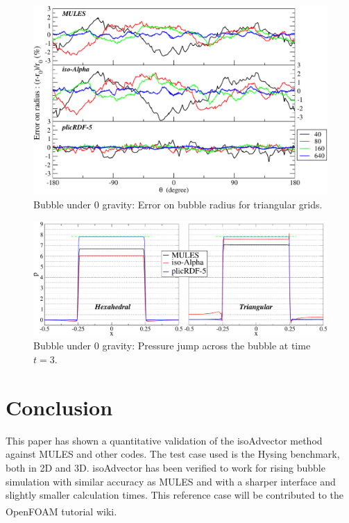 \documentclass[review]{elsarticle}
\begin{document}
\begin{figure}[!h]
  \includegraphics[width=\textwidth]{figures/spuriousCurrents_bubble_error_radius_uns.pdf}
  \caption{Bubble under 0 gravity: Error on bubble radius for triangular grids.}
  \label{fig:spuriousCurrents_bubble_error_radius_uns}
\end{figure}

\begin{figure}[!h]
  \includegraphics[width=\textwidth]{figures/spuriousCurrents_pressure_drop_t=3_160x320.pdf}
  \caption{Bubble under 0 gravity: Pressure jump across the bubble at time $t=3$.}
  \label{fig:spuriousCurrents_pressure_jump}
\end{figure}



\section{\small Conclusion}

This paper has shown a quantitative validation of the isoAdvector method against MULES and other 
codes. The test case used is the Hysing benchmark, both in 2D and 3D. isoAdvector has been verified to work for rising bubble simulation with similar accuracy as MULES and with a sharper interface and slightly smaller calculation times.
This reference case will be contributed to the OpenFOAM\textsuperscript{\textregistered} tutorial wiki.
\end{document}
